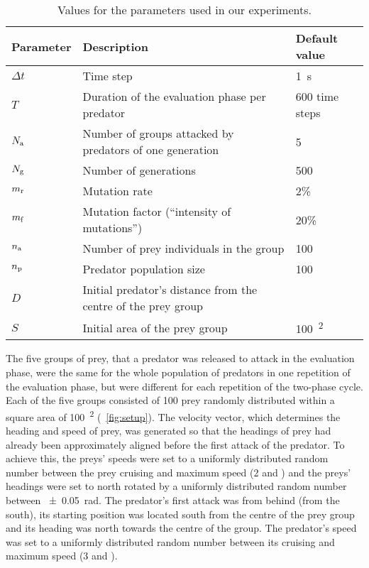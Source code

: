\begin{table}
	\caption{Values for the parameters used in our experiments.}
	\label{tab:parameters:ga}
	\begin{tabular}{lp{}l}
		\toprule
		Parameter & Description & Default value \\
		\midrule
		$\Delta t$  & Time step & \SI{1}{\second} \\
		$T$ & Duration of the evaluation phase per predator & 600 time steps \\
		$N_\textnormal{a}$ & Number of groups attacked by predators of one generation & 5 \\
		$N_\textnormal{g}$ & Number of generations & 500 \\
		$m_\textnormal{r}$ & Mutation rate & 2\% \\
		$m_\textnormal{f}$ & Mutation factor (``intensity of mutations'') & 20\% \\
		$n_\textnormal{a}$ & Number of prey individuals in the group & 100 \\
		$n_\textnormal{p}$ & Predator population size & 100 \\
		$D$ & Initial predator's distance from the centre of the prey group & \BL{200} \\
		$S$ & Initial area of the prey group & \SI{100}{\bodylength\squared} \\
		\bottomrule
	\end{tabular}
\end{table}

The five groups of prey, that a predator was released to attack in the evaluation phase, were the same for the whole population of predators in one repetition of the evaluation phase, but were different for each repetition of the two-phase cycle. Each of the five groups consisted of 100 prey randomly distributed within a square area of \SI{100}{\bodylength\squared} (\figurename~\ref{fig:setup}). The velocity vector, which determines the heading and speed of prey, was generated so that the headings of prey had already been approximately aligned before the first attack of the predator. To achieve this, the preys' speeds were set to a uniformly distributed random number between the prey cruising and maximum speed (2 and ) and the preys' headings were set to north rotated by a uniformly distributed random number between \SI{\pm0.05}{\radian}. The predator's first attack was from behind \cite{demsar2014simulated,handegard2012dynamics} (\ie from the south), its starting position was located  south from the centre of the prey group and its heading was north towards the centre of the group. The predator's speed was set to a uniformly distributed random number between its cruising and maximum speed (3 and ).


